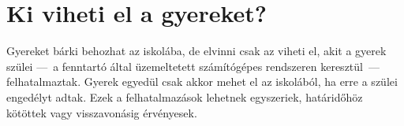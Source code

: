 \hypertarget{ki-viheti-el-a-gyereket}{%
\section{Ki viheti el a gyereket?}\label{ki-viheti-el-a-gyereket}}

Gyereket bárki behozhat az iskolába, de elvinni csak az viheti el, akit
a gyerek szülei ---~a fenntartó által üzemeltetett számítógépes
rendszeren keresztül~--- felhatalmaztak. Gyerek egyedül csak akkor mehet
el az iskolából, ha erre a szülei engedélyt adtak. Ezek a
felhatalmazások lehetnek egyszeriek, határidőhöz kötöttek vagy
visszavonásig érvényesek.
